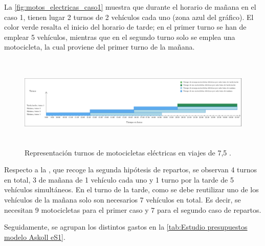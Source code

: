 La \autoref{fig:motos_electricas_caso1} muestra que durante el horario de mañana en el caso 1, tienen lugar 2 turnos de 2 vehículos cada uno (zona azul del gráfico). El color verde resalta el inicio del horario de tarde; en el primer turno se han de emplear 5 vehículos, mientras que en el segundo turno solo se emplea una motocicleta, la cual proviene del primer turno de la mañana.

\begin{figure}[ht]
    \centering
    \includegraphics[width= \textwidth, height=12em]{archivos/caso2_motos_electricas.pdf}
    \caption{Representación turnos de motocicletas eléctricas en viajes de 7,5 .}
    \label{fig:motos_electricas_caso22}
\end{figure}

Respecto a la \label{fig:motos_electricas_caso2}, que recoge la segunda hipótesis de repartos, se observan 4 turnos en total, 3 de mañana de 1 vehículo cada uno y 1 turno por la tarde de 5 vehículos simultáneos. En el turno de la tarde, como se debe reutilizar uno de los vehículos de la mañana solo son necesarios 7 vehículos en total. Es decir, se necesitan 9 motocicletas para el primer caso y 7 para el segundo caso de repartos.

Seguidamente, se agrupan los distintos gastos en la \autoref{tab:Estudio presupuestos modelo Askoll eS1}.

